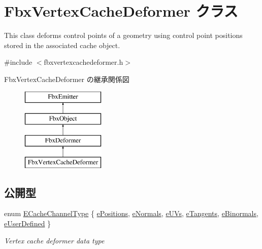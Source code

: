 \hypertarget{class_fbx_vertex_cache_deformer}{}\section{Fbx\+Vertex\+Cache\+Deformer クラス}
\label{class_fbx_vertex_cache_deformer}


This class deforms control points of a geometry using control point positions stored in the associated cache object.  




{\ttfamily \#include $<$fbxvertexcachedeformer.\+h$>$}

Fbx\+Vertex\+Cache\+Deformer の継承関係図\begin{figure}[H]
\begin{center}
\leavevmode
\includegraphics[height=4.000000cm]{class_fbx_vertex_cache_deformer}
\end{center}
\end{figure}
\subsection*{公開型}
\begin{DoxyCompactItemize}
\item 
enum \hyperlink{class_fbx_vertex_cache_deformer_a24f0c46d4f47717615852a8e7346efed}{E\+Cache\+Channel\+Type} \{ \newline
\hyperlink{class_fbx_vertex_cache_deformer_a24f0c46d4f47717615852a8e7346efedac49b3b06ec07fe6742bd8ff98e7d0fff}{e\+Positions}, 
\hyperlink{class_fbx_vertex_cache_deformer_a24f0c46d4f47717615852a8e7346efeda738fd8550a4585af86b9dde23838f019}{e\+Normals}, 
\hyperlink{class_fbx_vertex_cache_deformer_a24f0c46d4f47717615852a8e7346efedaac37961370b1bb10824e64a01adf1c21}{e\+U\+Vs}, 
\hyperlink{class_fbx_vertex_cache_deformer_a24f0c46d4f47717615852a8e7346efedafdee2e48b083adbf565b3bf511cbcce5}{e\+Tangents}, 
\newline
\hyperlink{class_fbx_vertex_cache_deformer_a24f0c46d4f47717615852a8e7346efeda9bbd6f088e2be8754e3b8c4a5b5943be}{e\+Binormals}, 
\hyperlink{class_fbx_vertex_cache_deformer_a24f0c46d4f47717615852a8e7346efedafdf33d4ddb69c7cc595986665c3eab27}{e\+User\+Defined}
 \}\begin{DoxyCompactList}\small\item\em Vertex cache deformer data type \end{DoxyCompactList}
\end{DoxyCompactItemize}
